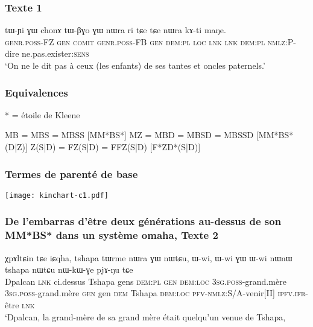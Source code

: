 \documentclass[xcolor=table]{beamer}
\newcommand{\ipa}[1]{{\phon #1}} %
\newcommand{\bleu}[1]{{\color{blue}#1}}
\newcommand{\rouge}[1]{{\color{red}#1}}
\begin{document}
  \begin{frame} 
 \frametitle{Texte 1} 
 \begin{exe}
\ex 
\gll 
\ipa{tɯ-ɲi} 	\ipa{ɣɯ} 	\ipa{chonɤ} 	\ipa{tɯ-βɣo} 	\ipa{ɣɯ} 	\ipa{nɯra} 	\ipa{ri} 	\ipa{tɕe} 	\ipa{tɕe} 	\ipa{nɯra} 	\ipa{kɤ-ti} 	\ipa{maŋe.} 	\\
\textsc{genr.poss}-FZ \textsc{gen} \textsc{comit} \textsc{genr.poss}-FB \textsc{gen} \textsc{dem:pl} \textsc{loc} \textsc{lnk}  \textsc{lnk}  \textsc{dem:pl} \textsc{nmlz:P}-dire  ne.pas.exister:\textsc{sens} \\
\glt `On ne le dit pas à ceux (les enfants) de ses tantes et oncles paternels.'
\end{exe}
\end{frame}

  \begin{frame} 
 \frametitle{Equivalences} 
 * = étoile de Kleene
\begin{exe}
\ex 
\glt MB = MBS = MBSS \bleu{[MM*BS*]} \rouge{\ipa{tɤ-rpɯ}}
\glt MZ = MBD = MBSD = MBSSD \bleu{[MM*BS*(D|Z)]} \rouge{\ipa{tɤ-ɬaʁ}}
\ex 
\glt Z(S|D) = FZ(S|D) = FFZ(S|D) \bleu{[F*ZD*(S|D)]} \rouge{\ipa{tɤ-ftsa}}
\end{exe}
\end{frame}

  \begin{frame} 
 \frametitle{Termes de parenté de base} 
\texttt{[image: kinchart-c1.pdf]}
\end{frame}

  \begin{frame} 
 \frametitle{De l'embarras d'être deux générations au-dessus de son MM*BS* dans un système omaha, Texte 2} 
 \begin{exe}
\ex 
\gll 
\ipa{χpɤltɕin} 	\ipa{tɕe} 	\ipa{iɕqha,} 	\ipa{tshapa} 	\ipa{tɯrme} 	\ipa{nɯra} 	\ipa{ɣɯ} 	\ipa{nɯtɕu,} \ipa{ɯ-wi,} 	\ipa{ɯ-wi} 	\ipa{ɣɯ} 	\ipa{ɯ-wi} 	\ipa{nɯnɯ} 	\ipa{tshapa} 	\ipa{nɯtɕu} 	\ipa{nɯ-kɯ-ɣe} 	\ipa{pjɤ-ŋu} 	\ipa{tɕe}  \\
Dpalcan \textsc{lnk} ci.dessus Tshapa gens  \textsc{dem:pl} \textsc{gen}  \textsc{dem:loc} \textsc{3sg.poss}-grand.mère  \textsc{3sg.poss}-grand.mère  \textsc{gen} gen \textsc{dem} Tshapa \textsc{dem:loc} \textsc{pfv}-\textsc{nmlz}:S/A-venir[II] \textsc{ipfv.ifr}-être \textsc{lnk}  \\
\glt `Dpalcan, la grand-mère de sa grand mère était quelqu'un venue de Tshapa, 
\end{exe}
\end{frame}
\end{document}
